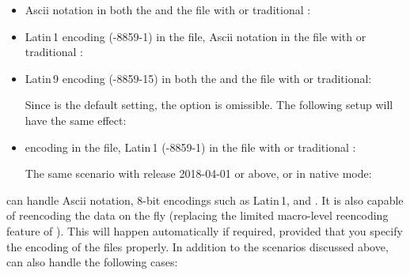 \documentclass{ltxdockit}[2011/03/25]
\newcommand*{\biber}{\sty{biber}\xspace}
\newcommand*{\biblatex}{\sty{biblatex}\xspace}
\begin{document}
\begin{itemize}
\setlength{\itemsep}{0pt}

\item Ascii notation in both the  and the  file with \pdftex or traditional \tex:

\begin{ltxexample}
\usepackage{biblatex}
\end{ltxexample}

\item Latin\,1 encoding (-8859-1) in the  file, Ascii notation in the  file with \pdftex or traditional \tex :

\begin{ltxexample}
\usepackage[latin1]{inputenc}
\usepackage[bibencoding=ascii]{biblatex}
\end{ltxexample}

\item Latin\,9 encoding (-8859-15) in both the  and the  file with \pdftex or traditional:

\begin{ltxexample}
\usepackage[latin9]{inputenc}
\usepackage[bibencoding=auto]{biblatex}
\end{ltxexample}
%
Since  is the default setting, the option is omissible. The following setup will have the same effect:

\begin{ltxexample}
\usepackage[latin9]{inputenc}
\usepackage{biblatex}
\end{ltxexample}

\item \utf encoding in the  file, Latin\,1 (-8859-1) in the  file with \pdftex or traditional \tex:

\begin{ltxexample}
\usepackage[utf8]{inputenc}
\usepackage[bibencoding=latin1]{biblatex}
\end{ltxexample}

The same scenario with \latex release 2018-04-01 or above, \xetex or \luatex in native \utf mode:

\begin{ltxexample}
\usepackage[bibencoding=latin1]{biblatex}
\end{ltxexample}

\end{itemize}

\biber can handle Ascii notation, 8-bit encodings such as Latin\,1, and \utf. It is also capable of reencoding the  data on the fly (replacing the limited macro-level reencoding feature of \biblatex). This will happen automatically if required, provided that you specify the encoding of the  files properly. In addition to the scenarios discussed above, \biber can also handle the following cases:
\end{document}
